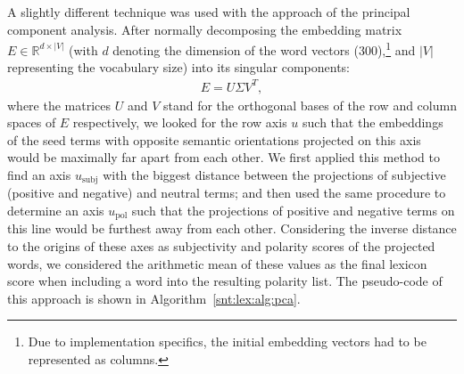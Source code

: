 A slightly different technique was used with the approach of the
principal component analysis.  After normally decomposing the
embedding matrix~$E\in\mathbb{R}^{d\times|V|}$ (with $d$ denoting the
dimension of the word vectors (300),\footnote{Due to implementation
  specifics, the initial embedding vectors had to be represented as
  columns.} and $|V|$ representing the vocabulary size) into its
singular components:
\begin{align*}
  E = U \Sigma V^T,
\end{align*}
where the matrices $U$ and $V$ stand for the orthogonal bases of the
row and column spaces of $E$ respectively, we looked for the row axis
$u$ such that the embeddings of the seed terms with opposite semantic
orientations projected on this axis would be maximally far apart from
each other.  We first applied this method to find an axis
$u_{\textrm{subj}}$ with the biggest distance between the projections
of subjective (positive and negative) and neutral terms; and then used
the same procedure to determine an axis $u_{\textrm{pol}}$ such that
the projections of positive and negative terms on this line would be
furthest away from each other.  Considering the inverse distance to
the origins of these axes as subjectivity and polarity scores of the
projected words, we considered the arithmetic mean of these values as
the final lexicon score when including a word into the resulting
polarity list.  The pseudo-code of this approach is shown in
Algorithm~\ref{snt:lex:alg:pca}.
